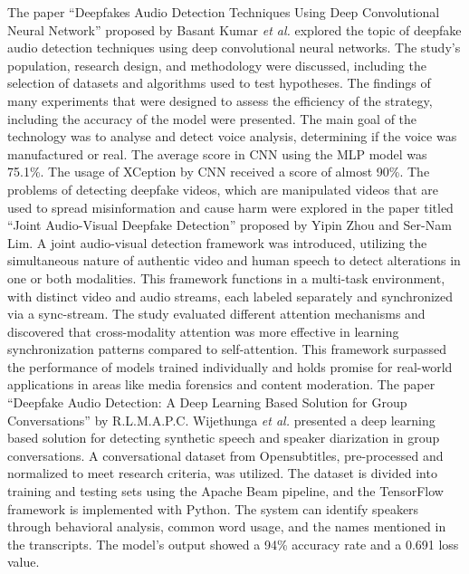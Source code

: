 \newline
The paper “Deepfakes Audio Detection Techniques Using Deep Convolutional Neural Network” \cite{b4} proposed by Basant Kumar \textit{et al.} explored the topic of deepfake audio detection techniques using deep convolutional neural networks. The study's population, research design, and methodology were discussed, including the selection of datasets and algorithms used to test hypotheses. The findings of many experiments that were designed to assess the efficiency of the strategy, including the accuracy of the model were presented. The main goal of the technology was to analyse and detect voice analysis, determining if the voice was manufactured or real. The average score in CNN using the MLP model was 75.1\%. The usage of XCeption by CNN received a score of almost 90\%. \newline
\newline
The problems of detecting deepfake videos, which are manipulated videos that are used to spread misinformation and cause harm were explored in the paper titled “Joint Audio-Visual Deepfake Detection” \cite{b5} proposed by Yipin Zhou and Ser-Nam Lim. A joint audio-visual detection framework was introduced, utilizing the simultaneous nature of authentic video and human speech to detect alterations in one or both modalities. This framework functions in a multi-task environment, with distinct video and audio streams, each labeled separately and synchronized via a sync-stream. The study evaluated different attention mechanisms and discovered that cross-modality attention was more effective in learning synchronization patterns compared to self-attention. This framework surpassed the performance of models trained individually and holds promise for real-world applications in areas like media forensics and content moderation.\newline
\newline
The paper “Deepfake Audio Detection: A Deep Learning Based Solution for Group Conversations” \cite{b6} by R.L.M.A.P.C. Wijethunga \textit{et al.} presented a deep learning based solution for detecting synthetic speech and speaker diarization in group conversations. A conversational dataset from Opensubtitles, pre-processed and normalized to meet research criteria, was utilized. The dataset is divided into training and testing sets using the Apache Beam pipeline, and the TensorFlow framework is implemented with Python. The system can identify speakers through behavioral analysis, common word usage, and the names mentioned in the transcripts. The model's output showed a 94\% accuracy rate and a 0.691 loss value.\newline
